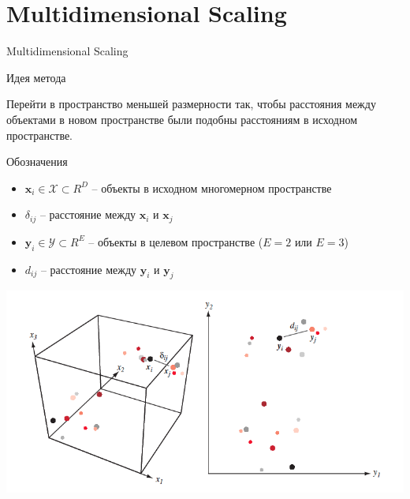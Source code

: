 \documentclass[10pt]{beamer}
\begin{document}
\section{Multidimensional Scaling}


\begin{frame}

\begin{center}
{\Large Multidimensional Scaling}
\end{center}

\end{frame}

\begin{frame}{Идея метода}

Перейти в пространство меньшей размерности так, чтобы расстояния между объектами в новом пространстве были подобны расстояниям в исходном пространстве.

\end{frame}

\begin{frame}{Обозначения}

\begin{itemize}
\item $\mathbf{x}_i \in \mathcal{X} \subset R^D$ -- объекты в исходном многомерном пространстве
\item $\delta_{ij}$ -- расстояние между $\mathbf{x}_i$ и $\mathbf{x}_j$
\item $\mathbf{y}_i \in \mathcal{Y} \subset R^E$ -- объекты в целевом пространстве ($E=2$ или $E=3$)
\item $d_{ij}$ -- расстояние между $\mathbf{y}_i$ и $\mathbf{y}_j$
\end{itemize}

\begin{center}
\includegraphics[scale=0.35]{images/mds.png}
\end{center}

\end{frame}
\end{document}
